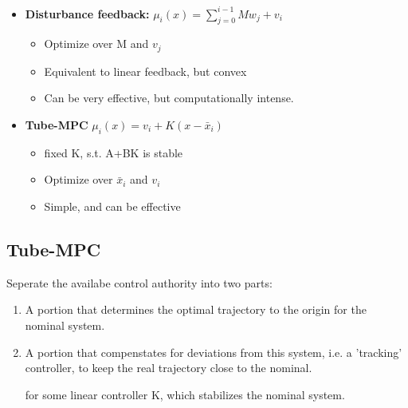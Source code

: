 \documentclass[8pt,a4paper]{scrartcl}
\begin{document}
\begin{multicols*}{3}
\begin{multicols*}{4}
{\begin{itemize}
\begin{itemize}
\item Optimize over $K_i$ and $v_i$
\item Non-convex. Extremely difficult to solve.
\end{itemize}
\item \textbf{Disturbance feedback:} $\mu_i(x)=\sum\limits_{j=0}^{i-1} Mw_j+v_i$
\begin{itemize}

\item Optimize over M and $v_j$
\item Equivalent to linear feedback, but convex
\item Can be very effective, but computationally intense.
\end{itemize}
\item \textbf{Tube-MPC} $\mu_i(x)=v_i+K(x-\bar{x}_i)$
\begin{itemize}

\item fixed K, s.t. A+BK is stable
\item Optimize over $\bar{x}_i$ and $v_i$
\item Simple, and can be effective
\end{itemize}
\end{itemize}
}%

\subsection{Tube-MPC}

Seperate the availabe control authority into two parts:

\begin{enumerate}

\item A portion that determines the optimal trajectory to the origin for the nominal system.
\item A portion that compenstates for deviations from this system, i.e. a 'tracking' controller, to keep the real trajectory close to the nominal.


for some linear controller K, which stabilizes the nominal system.
\end{enumerate}

\end{multicols*}
\end{multicols*}
\end{document}
